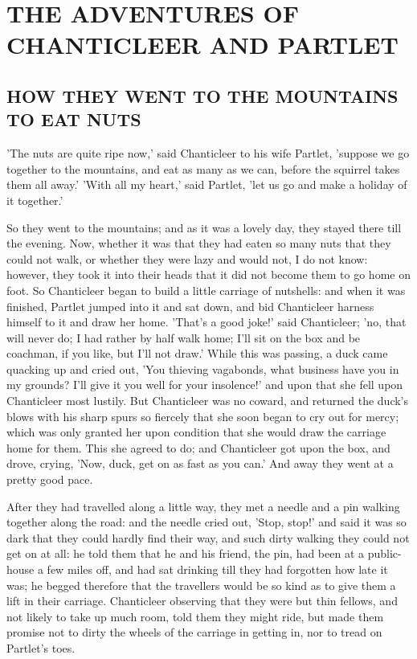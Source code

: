 \documentclass[12pt]{book}
\begin{document}
\chapter[THE ADVENTURES OF CHANTICLEER AND\ldots]{THE ADVENTURES OF CHANTICLEER AND PARTLET}


\section[HOW THEY WENT TO THE MOUNTAINS TO\ldots]{HOW THEY WENT TO THE MOUNTAINS TO EAT NUTS}

'The nuts are quite ripe now,' said Chanticleer to his wife Partlet,
'suppose we go together to the mountains, and eat as many as we can,
before the squirrel takes them all away.' 'With all my heart,' said
Partlet, 'let us go and make a holiday of it together.'

So they went to the mountains; and as it was a lovely day, they stayed
there till the evening. Now, whether it was that they had eaten so
many nuts that they could not walk, or whether they were lazy and
would not, I do not know: however, they took it into their heads that
it did not become them to go home on foot. So Chanticleer began to
build a little carriage of nutshells: and when it was finished,
Partlet jumped into it and sat down, and bid Chanticleer harness
himself to it and draw her home. 'That's a good joke!' said
Chanticleer; 'no, that will never do; I had rather by half walk home;
I'll sit on the box and be coachman, if you like, but I'll not draw.'
While this was passing, a duck came quacking up and cried out, 'You
thieving vagabonds, what business have you in my grounds? I'll give it
you well for your insolence!' and upon that she fell upon Chanticleer
most lustily. But Chanticleer was no coward, and returned the duck's
blows with his sharp spurs so fiercely that she soon began to cry out
for mercy; which was only granted her upon condition that she would
draw the carriage home for them. This she agreed to do; and
Chanticleer got upon the box, and drove, crying, 'Now, duck, get on as
fast as you can.' And away they went at a pretty good pace.

After they had travelled along a little way, they met a needle and a
pin walking together along the road: and the needle cried out, 'Stop,
stop!' and said it was so dark that they could hardly find their way,
and such dirty walking they could not get on at all: he told them that
he and his friend, the pin, had been at a public-house a few miles
off, and had sat drinking till they had forgotten how late it was; he
begged therefore that the travellers would be so kind as to give them
a lift in their carriage. Chanticleer observing that they were but
thin fellows, and not likely to take up much room, told them they
might ride, but made them promise not to dirty the wheels of the
carriage in getting in, nor to tread on Partlet's toes.
\end{document}
